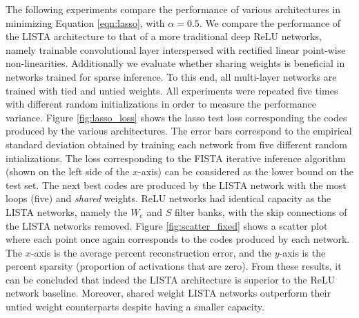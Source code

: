 The following experiments compare the performance of various architectures in
minimizing Equation \ref{eqn:lasso}, with $\alpha=0.5$. We compare the
performance of the LISTA architecture to that of a more traditional deep ReLU
networks, namely trainable convolutional layer interspersed with rectified
linear point-wise non-linearities.  Additionally we evaluate whether sharing
weights is beneficial in networks trained for sparse inference. To this end,
all multi-layer networks are trained with tied and untied weights. All
experiments were repeated five times with different random initializations in
order to measure the performance variance. Figure \ref{fig:lasso_loss}
shows the lasso test loss corresponding the codes produced by the various
architectures.  The error bars correspond to the empirical standard deviation
obtained by training each network from five different random intializations.
The loss corresponding to the FISTA iterative inference algorithm (shown on the
left side of the $x$-axis) can be considered as the lower bound on the test
set. The next best codes are produced by the LISTA network with the most loops
(five) and \emph{shared} weights. ReLU networks had identical capacity as the
LISTA networks, namely the $W_e$ and $S$ filter banks, with the skip
connections of the LISTA networks removed. Figure \ref{fig:scatter_fixed} shows
a scatter plot where each point once again corresponds to the codes produced by
each network. The $x$-axis is the average percent reconstruction error, and the
$y$-axis is the percent sparsity (proportion of activations that are zero).
From these results, it can be concluded that indeed the LISTA architecture is
superior to the ReLU network baseline. Moreover, shared weight LISTA networks
outperform their untied weight counterparts despite having a smaller capacity.       



